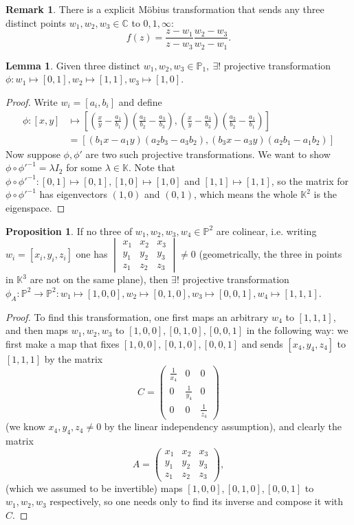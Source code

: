 \documentclass{article}
\newcommand{\C}{\mathbb{C}}
\newcommand{\K}{\mathbb{K}}
\newcommand{\p}{\mathbb{P}}
\theoremstyle{definition}
\newtheorem{prop}[defn]{Proposition}
\newtheorem{lemma}[defn]{Lemma}
\newtheorem{remark}[defn]{Remark}
\begin{document}
\begin{remark}
There is a explicit Möbius transformation that sends any three distinct points $w_1,w_2,w_3\in\C$ to $0,1,\infty$:
\[
f(z)=\frac{z-w_1}{z-w_3}\frac{w_2-w_3}{w_2-w_1}.
\]
\end{remark}
\begin{lemma}
Given three distinct $w_1,w_2,w_3\in\p_1,\ \exists!$ projective transformation $\phi:w_1\mapsto[0,1],w_2\mapsto[1,1],w_3\mapsto[1,0]$.
\end{lemma}
\begin{proof}
Write $w_i=[a_i,b_i]$ and define
\[
\begin{aligned}
\phi:[x,y]&\mapsto \left[\left(\frac{x}{y}-\frac{a_1}{b_1}\right)\left(\frac{a_2}{b_2}-\frac{a_3}{b_3}\right),\left(\frac{x}{y}-\frac{a_3}{b_3}\right)\left(\frac{a_2}{b_2}-\frac{a_1}{b_1}\right)\right]\\
&=[(b_1x-a_1y)(a_2b_3-a_3b_2),(b_3x-a_3y)(a_2b_1-a_1b_2)]
\end{aligned}
\]
Now suppose $\phi,\phi'$ are two such projective transformations. We want to show $\phi\circ\phi'^{-1}=\lambda I_2$ for some $\lambda\in\K$. Note that $\phi\circ\phi'^{-1}:[0,1]\mapsto [0,1],[1,0]\mapsto [1,0]$ and $[1,1]\mapsto [1,1]$, so the matrix for $\phi\circ\phi'^{-1}$ has eigenvectors $(1,0)$ and $(0,1)$, which means the whole $\K^2$ is the eigenspace.
\end{proof}

\begin{prop}
If no three of $w_1,w_2,w_3,w_4\in\p^2$ are colinear, i.e. writing $w_i=[x_i,y_i,z_i]$ one has $\begin{vmatrix}
x_1 & x_2 & x_3 \\ y_1 & y_2 & y_3 \\ z_1 & z_2 & z_3
\end{vmatrix}\neq 0$ (geometrically, the three in points in $\K^3$ are not on the same plane), then $\exists!$ projective transformation $\phi_A:\p^2\rightarrow\p^2:w_1\mapsto [1,0,0],w_2\mapsto [0,1,0],w_3\mapsto [0,0,1],w_4\mapsto [1,1,1]$.
\end{prop}
\begin{proof}
To find this transformation, one first maps an arbitrary $w_4$ to $[1,1,1]$, and then maps $w_1,w_2,w_3$ to $[1,0,0],[0,1,0],[0,0,1]$ in the following way: we first make a map that fixes $[1,0,0],[0,1,0],[0,0,1]$ and sends $[x_4,y_4,z_4]$ to $[1,1,1]$ by the matrix
\[
C=\begin{pmatrix}
\frac{1}{x_4} & 0 & 0 \\
0 & \frac{1}{y_4} & 0 \\
0 & 0 & \frac{1}{z_4}
\end{pmatrix}
\]
(we know $x_4,y_4,z_4\neq 0$ by the linear independency assumption), and clearly the matrix
\[
A=\begin{pmatrix}
x_1 & x_2 & x_3 \\ y_1 & y_2 & y_3 \\ z_1 & z_2 & z_3
\end{pmatrix},
\]
(which we assumed to be invertible) maps $[1,0,0],[0,1,0],[0,0,1]$ to $w_1,w_2,w_3$ respectively, so one needs only to find its inverse and compose it with $C$.
\end{proof}
\end{document}
